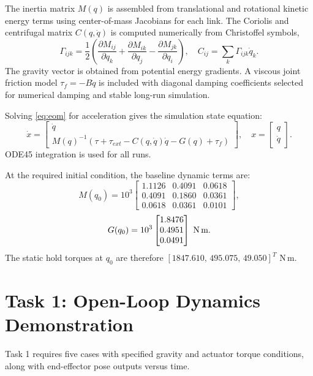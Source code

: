 \documentclass[11pt]{article}
\begin{document}
The inertia matrix $M(q)$ is assembled from translational and rotational kinetic energy terms using center-of-mass Jacobians for each link. The Coriolis and centrifugal matrix $C(q,\dot q)$ is computed numerically from Christoffel symbols,
\begin{equation}
\Gamma_{ijk}=\frac{1}{2}\left(\frac{\partial M_{ij}}{\partial q_k}+\frac{\partial M_{ik}}{\partial q_j}-\frac{\partial M_{jk}}{\partial q_i}\right),
\quad
C_{ij}=\sum_k \Gamma_{ijk}\dot q_k.
\end{equation}
The gravity vector is obtained from potential energy gradients. A viscous joint friction model $\tau_f=-B\dot q$ is included with diagonal damping coefficients selected for numerical damping and stable long-run simulation.

Solving \eqref{eq:eom} for acceleration gives the simulation state equation:
\begin{equation}
\dot x =
\begin{bmatrix}
\dot q\\
M(q)^{-1}\left(\tau+\tau_{ext}-C(q,\dot q)\dot q-G(q)+\tau_f\right)
\end{bmatrix},
\quad
x=\begin{bmatrix}q\\\dot q\end{bmatrix}.
\end{equation}
ODE45 integration is used for all runs.

At the required initial condition, the baseline dynamic terms are:
\begin{equation}
M(q_0)=10^3
\begin{bmatrix}
1.1126 & 0.4091 & 0.0618\\
0.4091 & 0.1860 & 0.0361\\
0.0618 & 0.0361 & 0.0101
\end{bmatrix},
\end{equation}
\begin{equation}
G(q_0)=10^3
\begin{bmatrix}
1.8476\\
0.4951\\
0.0491
\end{bmatrix}\;\text{N\,m}.
\end{equation}
The static hold torques at $q_0$ are therefore $[1847.610,\,495.075,\,49.050]^T$ N\,m.

\section{Task 1: Open-Loop Dynamics Demonstration}
Task 1 requires five cases with specified gravity and actuator torque conditions, along with end-effector pose outputs versus time.
\end{document}
